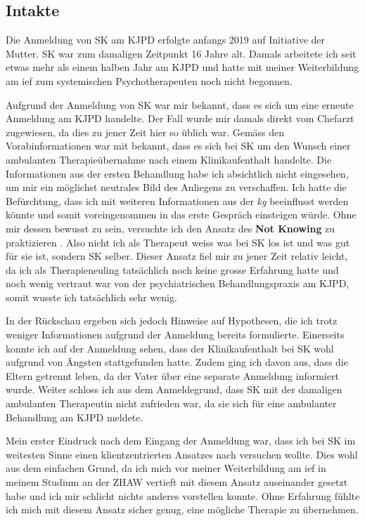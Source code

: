 \subsection{Intakte} 
Die Anmeldung von SK am KJPD erfolgte anfangs 2019 auf Initiative der Mutter. SK war zum damaligen Zeitpunkt 16 Jahre alt. Damals arbeitete ich seit etwas mehr als einem halben Jahr am KJPD und hatte mit meiner Weiterbildung am \ac{ief} zum systemischen Psychotherapeuten noch nicht begonnen. 

Aufgrund der Anmeldung von SK war mir bekannt, dass es sich um eine erneute Anmeldung am KJPD handelte. Der Fall wurde mir damals direkt vom Chefarzt zugewiesen, da dies zu jener Zeit hier so üblich war. Gemäss den Vorabinformationen war mit bekannt, dass es sich bei SK um den Wunsch einer ambulanten Therapieübernahme nach einem Klinikaufenthalt handelte. Die Informationen aus der ersten Behandlung habe ich absichtlich nicht eingesehen, um mir ein möglichst neutrales Bild des Anliegens zu verschaffen. Ich hatte die Befürchtung, dass ich mit weiteren Informationen aus der \textit{\ac{kg}} beeinflusst werden könnte und somit voreingenommen in das erste Gespräch einsteigen würde. Ohne mir dessen bewusst zu sein, versuchte ich den Ansatz des \textbf{Not Knowing} zu praktizieren \cite{Anderson1992}. Also nicht ich als Therapeut weiss was bei SK los ist und was gut für sie ist, sondern SK selber. Dieser Ansatz fiel mir zu jener Zeit relativ leicht, da ich als Therapieneuling tatsächlich noch keine grosse Erfahrung hatte und noch wenig vertraut war von der psychiatrischen Behandlungspraxis am KJPD, somit wusste ich tatsächlich sehr wenig. 

In der Rückschau ergeben sich jedoch Hinweise auf Hypothesen, die ich trotz weniger Informationen aufgrund der Anmeldung bereits formulierte. Einerseits konnte ich auf der Anmeldung sehen, dass der Klinikaufenthalt bei SK wohl aufgrund von Ängsten stattgefunden hatte. Zudem ging ich davon aus, dass die Eltern getrennt leben, da der Vater über eine separate Anmeldung informiert wurde. Weiter schloss ich aus dem Anmeldegrund, dass SK mit der damaligen ambulanten Therapeutin nicht zufrieden war, da sie sich für eine ambulanter Behandlung am KJPD meldete. 

Mein erster Eindruck nach dem Eingang der Anmeldung war, dass ich bei SK im weitesten Sinne einen klientzentrierten Ansatzes nach  versuchen wollte. Dies wohl aus dem einfachen Grund, da ich mich vor meiner Weiterbildung am \ac{ief} in meinem Studium an der ZHAW vertieft mit diesem Ansatz auseinander gesetzt habe und ich mir schlicht nichts anderes vorstellen konnte. Ohne Erfahrung fühlte ich mich mit diesem Ansatz sicher genug, eine mögliche Therapie zu übernehmen.

